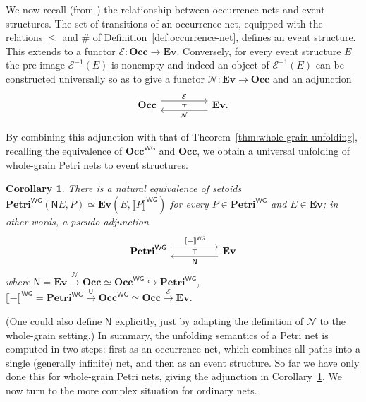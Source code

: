 \documentclass[11pt,a4paper]{article}
\theoremstyle{plain}
\newtheorem{corollary}[theorem]{Corollary}
\theoremstyle{definition}
\theoremstyle{remark}
\newcommand{\calN}{\mathcal{N}}
\newcommand{\calE}{\mathcal{E}}
\newcommand{\Occ}{\mathbf{Occ}}
\newcommand{\WGPetri}{\mathbf{Petri}^{\mathsf{WG}}}
\newcommand{\WGOcc}{\mathbf{Occ}^{\mathsf{WG}}}
\newcommand{\ES}{\mathbf{Ev}}
\newcommand{\semWG}{\llbracket - \rrbracket^{\mathsf{WG}}}
\newcommand{\semWGA}[1]{\llbracket #1 \rrbracket^{\mathsf{WG}}}
\begin{document}
\newcommand{\E}[0]{\mathsf{E}}
We now recall (from \cite{ES1, ES2}) the relationship between occurrence nets and event structures. The set of transitions of an occurrence net, equipped with the relations $\leq$ and $\#$ of Definition~\ref{def:occurrence-net}, defines an event structure. This extends to a functor $\calE:\Occ \to \ES$. Conversely, for every event structure $E$ the pre-image $\calE^{-1}(E)$ is nonempty and indeed an object of $\calE^{-1}(E)$ can be constructed universally so as to give a functor $\calN: \ES\to \Occ$ and an adjunction
\begin{equation}
\label{eq:occ-es}
\begin{tikzcd}
	\Occ && \ES.
	\arrow[""{name=0, anchor=center, inner sep=0}, "\calE", shift left=2, from=1-1, to=1-3]
	\arrow[""{name=1, anchor=center, inner sep=0}, "\cal{N}", shift left=2, from=1-3, to=1-1]
	\arrow["\dashv"{anchor=center, rotate=90}, draw=none, from=1, to=0]
\end{tikzcd}
\end{equation}
\newcommand{\N}{\mathsf{N}}

By combining this adjunction with that of Theorem~\ref{thm:whole-grain-unfolding}, recalling the equivalence of $\WGOcc$ and $\Occ$, we obtain a universal unfolding of whole-grain Petri nets to event structures. 
 \begin{corollary}
\label{cor:whole-grain-unfolding}
There is a natural equivalence of setoids $\WGPetri(\N E, P) \simeq \ES(E, \semWGA{P})$ for every $P \in \WGPetri$ and $E \in \ES$; in other words, a pseudo-adjunction
\[ 
\begin{tikzcd}
	\WGPetri && \ES
	\arrow[""{name=0, anchor=center, inner sep=0}, "\semWG", shift left =2, from=1-1, to=1-3]
	\arrow[""{name=1, anchor=center, inner sep=0}, "\N", shift left=2,  from=1-3, to=1-1]
	\arrow["\dashv"{anchor=center, rotate=90}, draw=none, from=1, to=0]
\end{tikzcd}
\]
where 
$\N = \ES \xrightarrow{\calN} \Occ \simeq \WGOcc \hookrightarrow \WGPetri$, 
$\semWG = \WGPetri \xrightarrow{\mathsf{U}} \WGOcc \simeq \Occ \xrightarrow{\calE} \ES.$
\end{corollary}
(One could also define $\N$ explicitly, just by adapting the definition of $\calN$ to the whole-grain setting.)
In summary, the unfolding semantics of a Petri net is computed in two steps: first as an occurrence net, which combines all paths into a single (generally infinite) net, and then as an event structure. So far we have only done this for whole-grain Petri nets, giving the adjunction in Corollary~\ref{cor:whole-grain-unfolding}. We now turn to the more complex situation for ordinary nets. 
\end{document}
